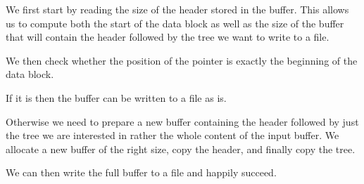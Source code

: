 
We first start by reading the size of the header stored in the buffer.
%
This allows us to compute both the start of the data block as well as the
size of the buffer that will contain the header followed by the tree we want
to write to a file.


We then check whether the position of the pointer is exactly the beginning
of the data block.

If it is then the buffer can be written to a file as is.

Otherwise we need to prepare a new buffer containing the header followed
by just the tree we are interested in rather the whole content of the input
buffer.
%
We allocate a new buffer of the right size, copy the header,
and finally copy the tree.

We can then write the full buffer to a file and happily succeed.
